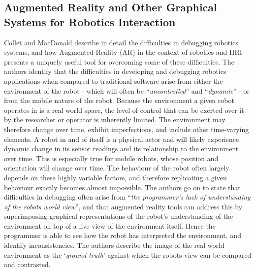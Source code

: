 \documentclass[titlepage,hidelinks,10pt]{article}
\begin{document}
\subsection{Augmented Reality and Other Graphical Systems for Robotics Interaction} \label{VRAndAR}
Collet and MacDonald\cite{AugmentedRealityDebuggingSystem} describe in detail the difficulties in debugging robotics systems, and how Augmented Reality (AR) in the context of robotics and HRI presents a uniquely useful tool for overcoming some of these difficulties. The authors identify that the difficulties in developing and debugging robotics applications when compared to traditional software arise from either the environment of the robot - which will often be ``\textit{uncontrolled}'' and ``\textit{dynamic}'' - or from the mobile nature of the robot. Because the environment a given robot operates in is a real world space, the level of control that can be exerted over it by the researcher or operator is inherently limited\cite{AugmentedRealityDebuggingSystem}. The environment may therefore change over time, exhibit imperfections, and include other time-varying elements. A robot in and of itself is a physical actor and will likely experience dynamic change in its sensor readings and its relationship to the environment over time. This is especially true for mobile robots, whose position and orientation will change over time. The behaviour of the robot often largely depends on these highly variable factors, and therefore replicating a given behaviour exactly becomes almost impossible. The authors go on to state that difficulties in debugging often arise from ``\textit{the programmer's lack of understanding of the robots world view}'', and that augmented reality tools can address this by superimposing graphical representations of the robot's understanding of the environment on top of a live view of the environment itself\cite{AugmentedRealityDebuggingSystem}. Hence the programmer is able to see how the robot has interpreted the environment, and identify inconsistencies. The authors describe the image of the real world environment as the `\textit{ground truth}' against which the robots view can be compared and contrasted.
\end{document}
